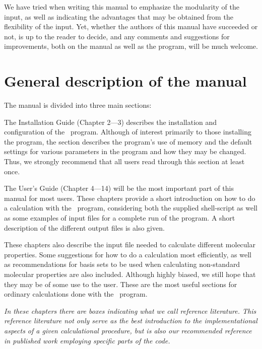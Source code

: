 We have tried when writing this manual to emphasize the modularity of
the input, as well as indicating  the advantages that may be obtained from
the flexibility of the input. Yet, whether the authors of
this manual have succeeded or not, is up to the reader to decide, and
any comments and suggestions for improvements, both on the manual as
well as the program, will be much welcome.

\section{General description of the manual}

The manual is divided into three main sections:

\begin{description}
\item The Installation Guide (Chapter 2---3) describes the
installation and configuration of the \siraba\ program. Although of
interest primarily to those installing the program, the section
describes the program's use of memory and the default settings for
various parameters in the program and how they may be changed. Thus,
we strongly recommend that all users read through this section at least
once.

\item The User's Guide (Chapter 4---14) will be the most important part
of this manual for most users. These chapters provide a  short
introduction on how to do a calculation with the \siraba\ program,
considering both the supplied shell-script as well as some examples of
input files for a complete run of the program. A short description of
the different output files is also given.

These chapters also describe the input file needed to
calculate different molecular properties. Some
suggestions for how to do a calculation most efficiently, as well as
recommendations for basis sets to be used when calculating non-standard
molecular properties are also included. Although highly biased, we
still hope that they may be of some
use to the user. These are the most useful sections for
ordinary calculations done with the \siraba\ program.

{\em In these chapters there are boxes indicating what we call {\em
reference literature}. This reference
literature not only serve as
the best introduction to the implementational aspects of a given
calculational procedure, but is also our recommended reference in published
work employing specific parts of the code.}


\end{description}
